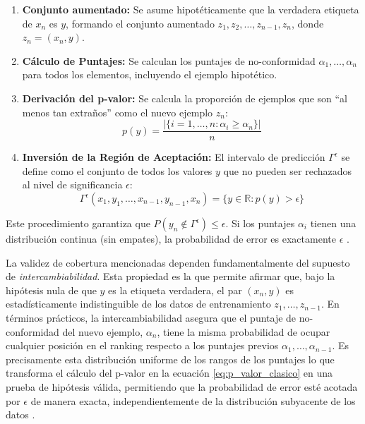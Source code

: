 \begin{enumerate}
    \item \textbf{Conjunto aumentado:} Se asume hipotéticamente que la verdadera etiqueta de $x_n$ es $y$, formando el conjunto aumentado $z_1, z_2, \dots, z_{n-1}, z_n$, donde $z_n = (x_n, y)$.
    \item \textbf{Cálculo de Puntajes:} Se calculan los puntajes de no-conformidad $\alpha_1, \dots, \alpha_n$ para todos los elementos, incluyendo el ejemplo hipotético. 
    \item \textbf{Derivación del p-valor:} Se calcula la proporción de ejemplos que son ``al menos tan extraños'' como el nuevo ejemplo $z_n$:
    \begin{equation}
        p(y) = \frac{|\{i = 1, \dots, n : \alpha_i \geq \alpha_n\}|}{n}
        \label{eq:p_valor_clasico}
    \end{equation}
    \item \textbf{Inversión de la Región de Aceptación:} El intervalo de predicción $\Gamma^{\epsilon}$ se define como el conjunto de todos los valores $y$ que no pueden ser rechazados al nivel de significancia $\epsilon$:
    \begin{equation}
        \Gamma^\epsilon(x_1, y_1, \dots, x_{n-1}, y_{n-1}, x_n) = \{y \in \mathbb{R} : p(y) > \epsilon\}
    \end{equation}
\end{enumerate}

Este procedimiento garantiza que $P(y_n \notin \Gamma^\epsilon) \leq \epsilon$. Si los puntajes $\alpha_i$ tienen una distribución continua (sin empates), la probabilidad de error es exactamente $\epsilon$ \parencite{Vovk2005}.

La validez de cobertura mencionadas dependen fundamentalmente del supuesto de \textit{intercambiabilidad}. Esta propiedad es la que permite afirmar que, bajo la hipótesis nula de que $y$ es la etiqueta verdadera, el par $(x_n, y)$ es estadísticamente indistinguible de los datos de entrenamiento $z_1, \dots, z_{n-1}$. En términos prácticos, la intercambiabilidad asegura que el puntaje de no-conformidad del nuevo ejemplo, $\alpha_n$, tiene la misma probabilidad de ocupar cualquier posición en el ranking respecto a los puntajes previos $\alpha_1, \dots, \alpha_{n-1}$. Es precisamente esta distribución uniforme de los rangos de los puntajes lo que transforma el cálculo del p-valor en la ecuación \eqref{eq:p_valor_clasico} en una prueba de hipótesis válida, permitiendo que la probabilidad de error esté acotada por $\epsilon$ de manera exacta, independientemente de la distribución subyacente de los datos \parencite{Vovk2022}.

